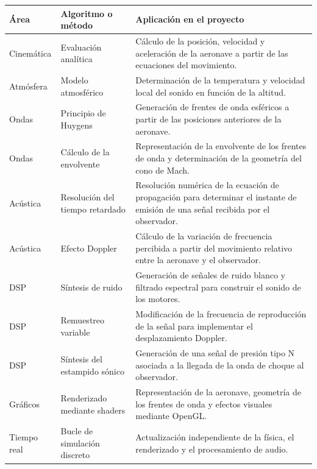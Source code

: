 \documentclass[10.5pt]{article}
\begin{document}
	\begin{table}[H]
		\centering
		\label{tab:algoritmos}
		\begin{tabular}{|l|p{4cm}|p{10cm}|}
			\hline
			\textbf{Área} & \textbf{Algoritmo o método} & \textbf{Aplicación en el proyecto} \\
			\hline
			Cinemática &
			Evaluación analítica &
			Cálculo de la posición, velocidad y aceleración de la aeronave a partir de las ecuaciones del movimiento. \\
			\hline
			Atmósfera &
			Modelo atmosférico &
			Determinación de la temperatura y velocidad local del sonido en función de la altitud. \\
			\hline
			Ondas &
			Principio de Huygens &
			Generación de frentes de onda esféricos a partir de las posiciones anteriores de la aeronave. \\
			\hline
			Ondas &
			Cálculo de la envolvente &
			Representación de la envolvente de los frentes de onda y determinación de la geometría del cono de Mach. \\
			\hline
			Acústica &
			Resolución del tiempo retardado &
			Resolución numérica de la ecuación de propagación para determinar el instante de emisión de una señal recibida por el observador. \\
			\hline
			Acústica &
			Efecto Doppler &
			Cálculo de la variación de frecuencia percibida a partir del movimiento relativo entre la aeronave y el observador. \\
			\hline
			DSP &
			Síntesis de ruido &
			Generación de señales de ruido blanco y filtrado espectral para construir el sonido de los motores. \\
			\hline
			DSP &
			Remuestreo variable &
			Modificación de la frecuencia de reproducción de la señal para implementar el desplazamiento Doppler. \\
			\hline
			DSP &
			Síntesis del estampido sónico &
			Generación de una señal de presión tipo N asociada a la llegada de la onda de choque al observador. \\
			\hline
			Gráficos &
			Renderizado mediante shaders &
			Representación de la aeronave, geometría de los frentes de onda y efectos visuales mediante OpenGL. \\
			\hline
			Tiempo real &
			Bucle de simulación discreto &
			Actualización independiente de la física, el renderizado y el procesamiento de audio. \\
			\hline
		\end{tabular}
	\end{table}
	
\end{document}
